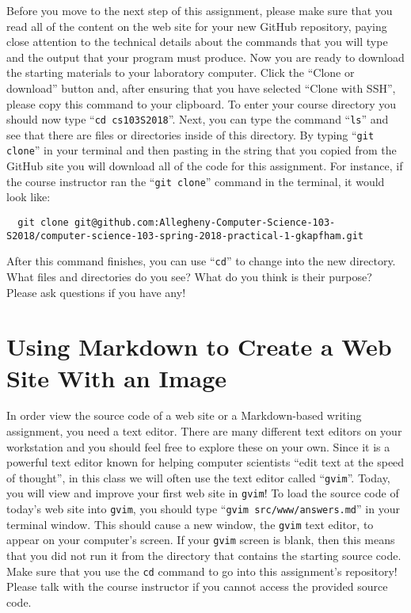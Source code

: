 \documentclass[11pt]{article}
\newcommand{\command}[1]{``\lstinline{#1}''}
\newcommand{\program}[1]{\lstinline{#1}}
\begin{document}
Before you move to the next step of this assignment, please make sure that you read all of the content on the web site
for your new GitHub repository, paying close attention to the technical details about the commands that you will type
and the output that your program must produce. Now you are ready to download the starting materials to your laboratory
computer. Click the ``Clone or download'' button and, after ensuring that you have selected ``Clone with SSH'', please
copy this command to your clipboard. To enter your course directory you should now type \command{cd cs103S2018}. Next,
you can type the command \command{ls} and see that there are files or directories inside of this directory. By typing
\command{git clone} in your terminal and then pasting in the string that you copied from the GitHub site you will
download all of the code for this assignment. For instance, if the course instructor ran the \command{git clone} command
in the terminal, it would look like:

\begin{lstlisting}
  git clone git@github.com:Allegheny-Computer-Science-103-S2018/computer-science-103-spring-2018-practical-1-gkapfham.git
\end{lstlisting}

After this command finishes, you can use \command{cd} to change into the new directory. What files and directories do
you see? What do you think is their purpose? Please ask questions if you have any!

\section*{Using Markdown to Create a Web Site With an Image}

In order view the source code of a web site or a Markdown-based writing assignment, you need a text editor. There are
many different text editors on your workstation and you should feel free to explore these on your own. Since it is a
powerful text editor known for helping computer scientists ``edit text at the speed of thought'', in this class we will
often use the text editor called \command{gvim}. Today, you will view and improve your first web site in {\tt gvim}! To
load the source code of today's web site into \program{gvim}, you should type \command{gvim src/www/answers.md} in your
terminal window. This should cause a new window, the \program{gvim} text editor, to appear on your computer's screen. If
your \program{gvim} screen is blank, then this means that you did not run it from the directory that contains the
starting source code. Make sure that you use the \program{cd} command to go into this assignment's repository! Please
talk with the course instructor if you cannot access the provided source code.
\end{document}
